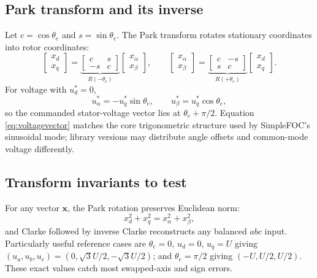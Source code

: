 \documentclass[10pt,letterpaper]{article}
\begin{document}
\subsection{Park transform and its inverse}
Let $c=\cos\theta_e$ and $s=\sin\theta_e$. The Park transform rotates stationary coordinates into rotor coordinates:
\begin{equation}\label{eq:park}
\begin{bmatrix}x_d\\x_q\end{bmatrix}=\underbrace{\begin{bmatrix}c&s\\-s&c\end{bmatrix}}_{R(-\theta_e)}
\begin{bmatrix}x_\alpha\\x_\beta\end{bmatrix},\qquad
\begin{bmatrix}x_\alpha\\x_\beta\end{bmatrix}=\underbrace{\begin{bmatrix}c&-s\\s&c\end{bmatrix}}_{R(+\theta_e)}
\begin{bmatrix}x_d\\x_q\end{bmatrix}.
\end{equation}
For voltage with $u_d^*=0$,
\begin{equation}\label{eq:voltagevector}
u_\alpha^*=-u_q^*\sin\theta_e,\qquad u_\beta^*=u_q^*\cos\theta_e,
\end{equation}
so the commanded stator-voltage vector lies at $\theta_e+\pi/2$. Equation \eqref{eq:voltagevector} matches the core trigonometric structure used by SimpleFOC's sinusoidal mode; library versions may distribute angle offsets and common-mode voltage differently.

\subsection{Transform invariants to test}
For any vector $\bm x$, the Park rotation preserves Euclidean norm:
\begin{equation}
x_d^2+x_q^2=x_\alpha^2+x_\beta^2,
\end{equation}
and Clarke followed by inverse Clarke reconstructs any balanced $abc$ input. Particularly useful reference cases are $\theta_e=0$, $u_d=0$, $u_q=U$ giving $(u_a,u_b,u_c)=(0,\sqrt3 U/2,-\sqrt3 U/2)$; and $\theta_e=\pi/2$ giving $(-U,U/2,U/2)$. These exact values catch most swapped-axis and sign errors.
\end{document}
